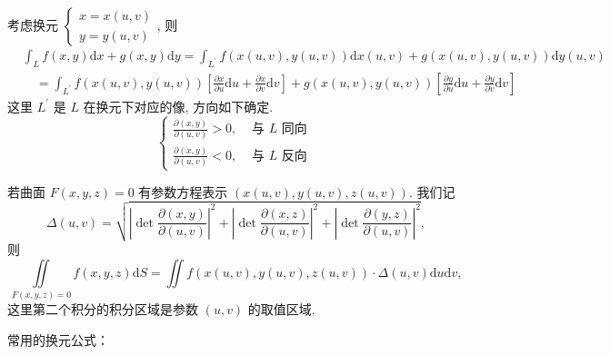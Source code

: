 \begin{theorem}[第二类曲线积分换元法]\label{thm:second-type-curve-integral-change-of-variable}
    考虑换元 $\left\{\begin{array}{l}x=x(u, v) \\ y=y(u, v)\end{array}\right.$, 则
{\small
$$
\begin{aligned}
& \int_L f(x, y) \mathrm{d} x+g(x, y) \mathrm{d} y=\int_{L^{\prime}} f(x(u, v), y(u, v)) \mathrm{d} x(u, v)+g(x(u, v), y(u, v)) \mathrm{d} y(u, v) \\
& \quad=\int_{L^{\prime}} f(x(u, v), y(u, v))\left[\frac{\partial x}{\partial u} \mathrm{d} u+\frac{\partial x}{\partial v} \mathrm{d} v\right]+g(x(u, v), y(u, v))\left[\frac{\partial y}{\partial u} \mathrm{d} u+\frac{\partial y}{\partial v} \mathrm{d} v\right]
\end{aligned}
$$
}
这里 $L^{\prime}$ 是 $L$ 在换元下对应的像, 方向如下确定.
$$
\begin{cases}\frac{\partial(x, y)}{\partial ( u, v)}>0, & \text { 与 } L \text{ 同向 } \\ \frac{\partial(x, y)}{\partial(u, v)}<0, & \text { 与 } L \text{ 反向 }\end{cases}
$$
\end{theorem}

\begin{theorem}[第一类曲面积分的参数方程法]\label{thm:first-type-surface-integral-parameter-equation}
    若曲面 $F(x, y, z)=0$ 有参数方程表示 $(x(u, v), y(u, v), z(u, v))$. 我们记
    \[
        \Delta(u, v)=\sqrt{\left|\operatorname{det} \frac{\partial(x, y)}{\partial(u, v)}\right|^2+\left|\operatorname{det} \frac{\partial(x, z)}{\partial(u, v)}\right|^2+\left|\operatorname{det} \frac{\partial(y, z)}{\partial(u, v)}\right|^2},
    \]
    则
    \[
        \iint\limits_{F(x, y, z)=0} f(x, y, z) \mathrm{d} S=\iint\limits f(x(u, v), y(u, v), z(u, v)) \cdot \Delta(u, v) \mathrm{d} u \mathrm{d} v,
    \]
    这里第二个积分的积分区域是参数 $(u, v)$ 的取值区域.
\end{theorem}

常用的换元公式：

